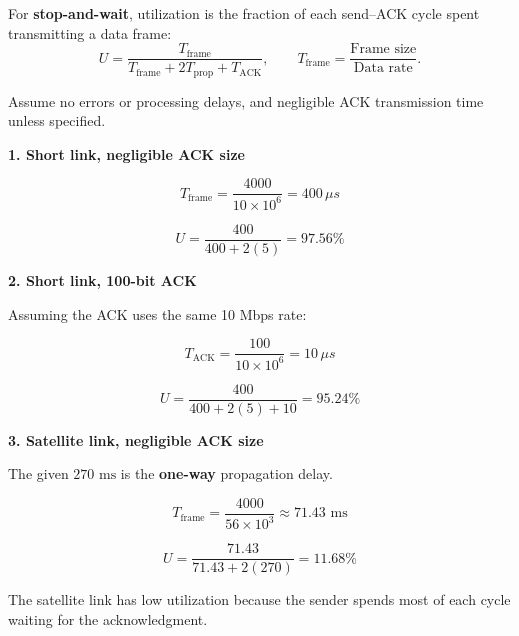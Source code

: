 \documentclass[11pt]{article}
\begin{document}
For \textbf{stop-and-wait}, utilization is the fraction of each send--ACK cycle spent transmitting a data frame:
\[
U=\frac{T_{\text{frame}}}{T_{\text{frame}}+2T_{\text{prop}}+T_{\text{ACK}}},
\qquad T_{\text{frame}}=\frac{\text{Frame size}}{\text{Data rate}}.
\]

Assume no errors or processing delays, and negligible ACK transmission time unless specified.

\textbf{1. Short link, negligible ACK size}

\[
T_{\text{frame}}=\frac{4000}{10\times10^6}
=400\,\mu s
\]

\[
U=\frac{400}{400+2(5)}
=\boxed{97.56\%}
\]

\textbf{2. Short link, 100-bit ACK}

Assuming the ACK uses the same 10 Mbps rate:

\[
T_{\text{ACK}}=\frac{100}{10\times10^6}=10\,\mu s
\]

\[
U=\frac{400}{400+2(5)+10}
=\boxed{95.24\%}
\]

\textbf{3. Satellite link, negligible ACK size}

The given \(270\text{ ms}\) is the \textbf{one-way} propagation delay.

\[
T_{\text{frame}}=\frac{4000}{56\times10^3}
\approx71.43\text{ ms}
\]

\[
U=\frac{71.43}{71.43+2(270)}
=\boxed{11.68\%}
\]

The satellite link has low utilization because the sender spends most of each cycle waiting for the acknowledgment.
\end{document}
